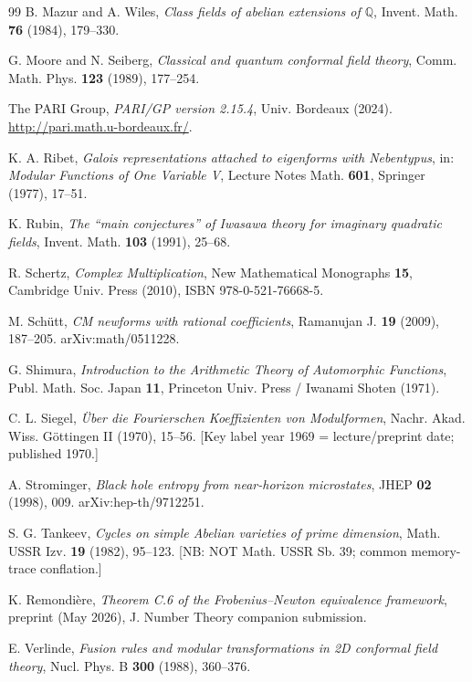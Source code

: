 \documentclass[11pt,a4paper]{amsart}
\theoremstyle{definition}
\newcommand{\Q}{\mathbb{Q}}
\begin{document}
\begin{thebibliography}{99}
 B. Mazur and A. Wiles, \emph{Class fields of abelian extensions of $\Q$}, Invent. Math. \textbf{76} (1984), 179--330.

 G. Moore and N. Seiberg, \emph{Classical and quantum conformal field theory}, Comm. Math. Phys. \textbf{123} (1989), 177--254.

 The PARI Group, \emph{PARI/GP version 2.15.4}, Univ. Bordeaux (2024). \url{http://pari.math.u-bordeaux.fr/}.

 K. A. Ribet, \emph{Galois representations attached to eigenforms with Nebentypus}, in: \emph{Modular Functions of One Variable V}, Lecture Notes Math. \textbf{601}, Springer (1977), 17--51.

 K. Rubin, \emph{The ``main conjectures'' of Iwasawa theory for imaginary quadratic fields}, Invent. Math. \textbf{103} (1991), 25--68.

 R. Schertz, \emph{Complex Multiplication}, New Mathematical Monographs \textbf{15}, Cambridge Univ. Press (2010), ISBN 978-0-521-76668-5.

 M. Sch\"utt, \emph{CM newforms with rational coefficients}, Ramanujan J. \textbf{19} (2009), 187--205. arXiv:math/0511228.

 G. Shimura, \emph{Introduction to the Arithmetic Theory of Automorphic Functions}, Publ. Math. Soc. Japan \textbf{11}, Princeton Univ. Press / Iwanami Shoten (1971).

 C. L. Siegel, \emph{\"Uber die Fourierschen Koeffizienten von Modulformen}, Nachr. Akad. Wiss. G\"ottingen II (1970), 15--56. [Key label year 1969 = lecture/preprint date; published 1970.]

 A. Strominger, \emph{Black hole entropy from near-horizon microstates}, JHEP \textbf{02} (1998), 009. arXiv:hep-th/9712251.

 S. G. Tankeev, \emph{Cycles on simple Abelian varieties of prime dimension}, Math. USSR Izv. \textbf{19} (1982), 95--123. [NB: NOT Math. USSR Sb. 39; common memory-trace conflation.]

 K. Remondi\`ere, \emph{Theorem C.6 of the Frobenius--Newton equivalence framework}, preprint (May 2026), J. Number Theory companion submission.

 E. Verlinde, \emph{Fusion rules and modular transformations in 2D conformal field theory}, Nucl. Phys. B \textbf{300} (1988), 360--376.


\end{thebibliography}
\end{document}
